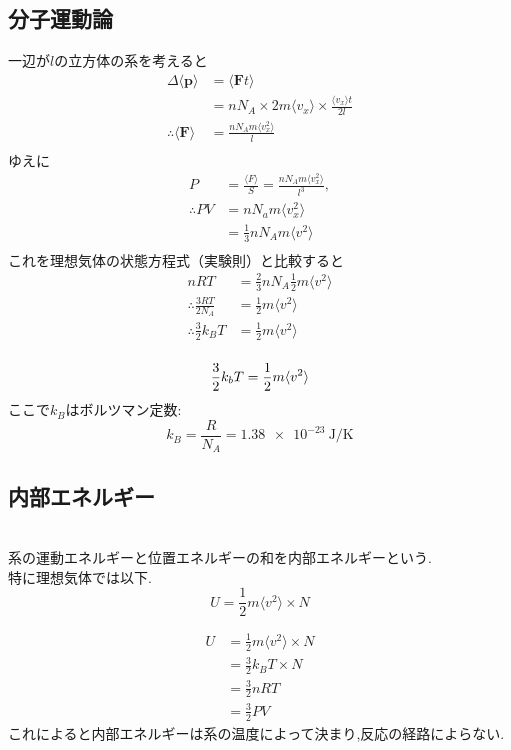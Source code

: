\documentclass[dvipdfmx,uplatex]{jsarticle}
\begin{document}
\subsection{分子運動論}
一辺が$l$の立方体の系を考えると
\begin{align*}
\Delta \langle \bm{p} \rangle &= \langle \bm{F} t \rangle \\
&= nN_A \times 2m \langle v_x \rangle \times \frac{\langle v_x\rangle t}{2l} \\
\therefore \langle \bm{F} \rangle &= \frac{nN_A m \langle v_x^2 \rangle}{l} \\
\end{align*}
ゆえに
\begin{align*}
P &= \frac{\langle F \rangle}{S} = \frac{nN_A m \langle v_x^2 \rangle}{l^3}, \\
\therefore PV &= nN_a m \langle v_x^2 \rangle \\
&= \frac{1}{3} nN_A m \langle v^2 \rangle \\
\end{align*}
これを理想気体の状態方程式（実験則）と比較すると
\begin{align*}
nRT &= \frac{2}{3} nN_A \frac{1}{2} m \langle v^2 \rangle \\
\therefore \frac{3RT}{2N_A} &= \frac{1}{2} m \langle v^2 \rangle \\
\therefore \frac{3}{2}k_BT &= \frac{1}{2} m \langle v^2 \rangle\\
\end{align*}
\begin{defi}[温度Tの定義]
\[
 \frac{3}{2}k_bT = \frac{1}{2} m \langle v^2 \rangle\\
\]
ここで$k_B$はボルツマン定数:
\[
k_B = \frac{R}{N_A} = \SI{1.38e-23}{\joule \per \kelvin}
\]
\end{defi}

\subsection{内部エネルギー}
\begin{defi}[内部エネルギー] \mbox{} \\
系の運動エネルギーと位置エネルギーの和を内部エネルギーという. \\
特に理想気体では以下.
\[
U = \frac{1}{2}m \langle v^2 \rangle \times N
\]
\end{defi}
\begin{cor}[内部エネルギーの表現]
\begin{align*}
U &= \frac{1}{2}m \langle v^2 \rangle \times N \\
&= \frac{3}{2}k_BT \times N \\
&= \frac{3}{2}nRT \\
&= \frac{3}{2}PV
\end{align*}
これによると内部エネルギーは系の温度によって決まり,反応の経路によらない.
\end{cor}
\end{document}
